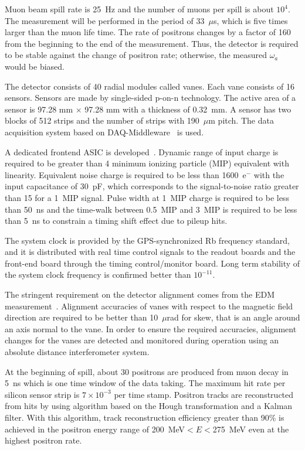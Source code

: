 Muon beam spill rate is 25~Hz and the number of muons per spill is about $10^4$.
The measurement will be performed in the period of 33~$\mu$s, which is
five times larger than the muon life time. The rate of positrons
changes by a factor of 160 from the beginning to the end of the measurement.
Thus, the detector is required to be stable against the change of positron rate;
otherwise, the measured $\omega_a$ would be biased.

The detector consists of 40 radial modules called vanes.
Each vane consists of 16 sensors.
Sensors are made by single-sided p-on-n technology.
The active area of a sensor is 97.28 mm $\times$ 97.28 mm with
a thickness of 0.32~mm.
A sensor has two blocks of 512 strips and the number of strips
with 190~$\mu$m pitch.
The data acquisition system based on DAQ-Middleware~\cite{daqmiddleware} is used.

A dedicated frontend ASIC is developed~\cite{Tsutsumi:2019ffq}.
Dynamic range of input charge is required to be greater than
4 minimum ionizing particle (MIP) equivalent with linearity.
Equivalent noise charge is required to be less than 
1600~e$^{-}$ with the input capacitance of 30~pF, which
corresponds to the signal-to-noise ratio greater than 15
for a 1~MIP signal. Pulse width at 1~MIP charge is required to
be less than 50~ns and the time-walk between 0.5~MIP and 3~MIP
is required to be less than 5~ns to constrain a timing shift effect
due to pileup hits.

The system clock is provided by the GPS-synchronized Rb frequency
standard, and it is distributed with real time control signals
to the readout boards and the front-end board through the timing
control/monitor board. Long term stability of the system clock
frequency is confirmed better than $10^{-11}$.

The stringent requirement on the detector alignment comes
from the EDM measurement~\cite{EDM_requirement}. Alignment accuracies of vanes
with respect to the magnetic field direction
are required to be better than 10~$\mu$rad for skew, that is an
angle around an axis normal to the vane. 
In order to ensure the required accuracies, alignment changes for the
vanes are detected and monitored during operation using an absolute
distance interferometer system.

At the beginning of spill, about 30 positrons are produced from muon decay in 5~ns which is one time window of the data taking.
The maximum hit rate per silicon sensor strip is $7 \times 10^{-3}$ per time stamp.
Positron tracks are reconstructed from hits by using algorithm based on
the Hough transformation and a Kalman filter.
With this algorithm, track reconstruction efficiency
greater than 90\% is achieved in the positron energy range of
200~MeV$<E<$275~MeV even at the highest positron rate.

